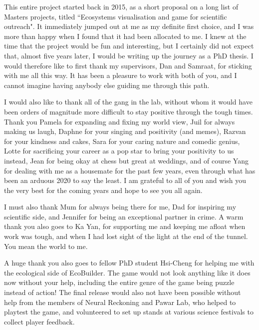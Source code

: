 \cleardoublepage


\begin{acknowledgements}

This entire project started back in 2015, as a short proposal on a long list of Masters projects, titled ``Ecosystems visualisation and game for scientific outreach". It immediately jumped out at me as my definite first choice, and I was more than happy when I found that it had been allocated to me. I knew at the time that the project would be fun and interesting, but I certainly did not expect that, almost five years later, I would be writing up the journey as a PhD thesis.
I would therefore like to first thank my supervisors, Dan and Samraat, for sticking with me all this way. It has been a pleasure to work with both of you, and I cannot imagine having anybody else guiding me through this path.

I would also like to thank all of the gang in the lab, without whom it would have been orders of magnitude more difficult to stay positive through the tough times. Thank you Pamela for expanding and fixing my world view, Juil for always making us laugh, Daphne for your singing and positivity (and memes), Razvan for your kindness and cakes, Sara for your caring nature and comedic genius, Lotte for sacrificing your career as a pop star to bring your positivity to us instead, Jean for being okay at chess but great at weddings, and of course Yang for dealing with me as a housemate for the past few years, even through what has been an arduous 2020 to say the least.
I am grateful to all of you and wish you the very best for the coming years and hope to see you all again.

I must also thank Mum for always being there for me, Dad for inspiring my scientific side, and Jennifer for being an exceptional partner in crime. A warm thank you also goes to Ka Yan, for supporting me and keeping me afloat when work was tough, and when I had lost sight of the light at the end of the tunnel. You mean the world to me.

A huge thank you also goes to fellow PhD student Hsi-Cheng for helping me with the ecological side of EcoBuilder. The game would not look anything like it does now without your help, including the entire genre of the game being puzzle instead of action!
The final release would also not have been possible without help from the members of Neural Reckoning and Pawar Lab, who helped to playtest the game, and volunteered to set up stands at various science festivals to collect player feedback.


\end{acknowledgements}
